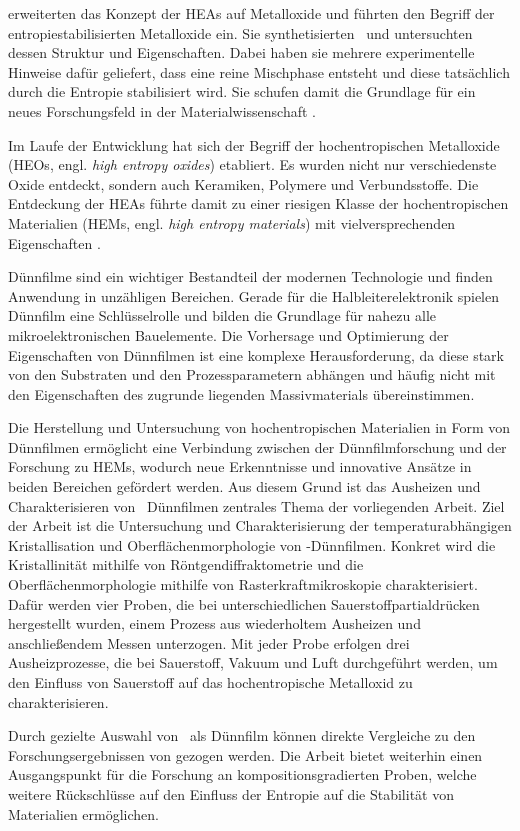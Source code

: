  erweiterten das Konzept der HEAs auf Metalloxide und führten den Begriff der
entropiestabilisierten Metalloxide ein.
Sie synthetisierten \heo\ und untersuchten dessen Struktur und Eigenschaften.
Dabei haben sie mehrere experimentelle Hinweise dafür geliefert, dass eine reine Mischphase entsteht und diese
tatsächlich durch die Entropie stabilisiert wird.
Sie schufen damit die Grundlage für ein neues Forschungsfeld in der Materialwissenschaft \autocite{Rost2015}.

Im Laufe der Entwicklung hat sich der Begriff der hochentropischen Metalloxide (HEOs, engl. \textit{high entropy oxides})
etabliert.
Es wurden nicht nur verschiedenste Oxide entdeckt, sondern auch Keramiken, Polymere und Verbundsstoffe.
Die Entdeckung der HEAs führte damit zu einer riesigen Klasse der hochentropischen Materialien (HEMs, engl.
\textit{high entropy materials}) mit vielversprechenden Eigenschaften \autocite{Yeh2018}.

Dünnfilme sind ein wichtiger Bestandteil der modernen Technologie und finden Anwendung in unzähligen Bereichen.
Gerade für die Halbleiterelektronik spielen Dünnfilm eine Schlüsselrolle und bilden die Grundlage für
nahezu alle mikroelektronischen Bauelemente.
Die Vorhersage und Optimierung der Eigenschaften von Dünnfilmen ist eine komplexe Herausforderung, da diese stark von
den Substraten und den Prozessparametern abhängen und häufig nicht mit den Eigenschaften des zugrunde liegenden
Massivmaterials übereinstimmen.

Die Herstellung und Untersuchung von hochentropischen Materialien in Form von Dünnfilmen ermöglicht eine Verbindung
zwischen der Dünnfilmforschung und der Forschung zu HEMs, wodurch neue Erkenntnisse und innovative
Ansätze in beiden Bereichen gefördert werden.
Aus diesem Grund ist das Ausheizen und Charakterisieren von \heo\ Dünnfilmen zentrales Thema der vorliegenden Arbeit.
Ziel der Arbeit ist die Untersuchung und Charakterisierung der temperaturabhängigen Kristallisation und
Oberflächenmorphologie von \heo-Dünnfilmen.
Konkret wird die Kristallinität mithilfe von Röntgendiffraktometrie und die Oberflächenmorphologie mithilfe von
Rasterkraftmikroskopie charakterisiert.
Dafür werden vier Proben, die bei unterschiedlichen Sauerstoffpartialdrücken hergestellt wurden,
einem Prozess aus wiederholtem Ausheizen und anschließendem Messen unterzogen.
Mit jeder Probe erfolgen drei Ausheizprozesse, die bei Sauerstoff, Vakuum und Luft durchgeführt werden, um den Einfluss
von Sauerstoff auf das hochentropische Metalloxid zu charakterisieren.

Durch gezielte Auswahl von \heo\ als Dünnfilm können direkte Vergleiche zu den Forschungsergebnissen von
 gezogen werden.
Die Arbeit bietet weiterhin einen Ausgangspunkt für die Forschung an kompositionsgradierten Proben, welche weitere
Rückschlüsse auf den Einfluss der Entropie auf die Stabilität von Materialien ermöglichen.
